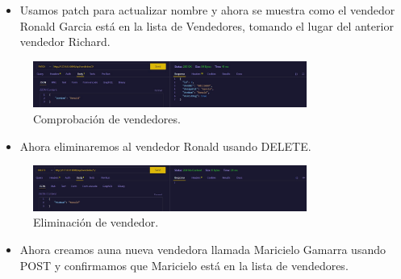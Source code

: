 \documentclass{article}
\begin{document}
    \begin{itemize}
        \item Usamos patch para actualizar nombre y ahora se muestra como el vendedor Ronald Garcia está en la lista de Vendedores, tomando el lugar del anterior vendedor Richard.
    \end{itemize}
    \begin{figure}[H]
		\centering
        \includegraphics[width=0.8\textwidth,keepaspectratio]{img/b10.jpeg}
		\caption{Comprobación de vendedores.}
    \end{figure}
    \begin{itemize}
        \item Ahora eliminaremos al vendedor Ronald usando DELETE.
    \end{itemize}
    \begin{figure}[H]
		\centering
        \includegraphics[width=0.8\textwidth,keepaspectratio]{img/b12.jpeg}
		\caption{Eliminación de vendedor.}
    \end{figure}
    \begin{itemize}
        \item Ahora creamos auna nueva vendedora llamada Maricielo Gamarra usando POST y  confirmamos que Maricielo está en la lista de vendedores.
    \end{itemize}
  
\end{document}
